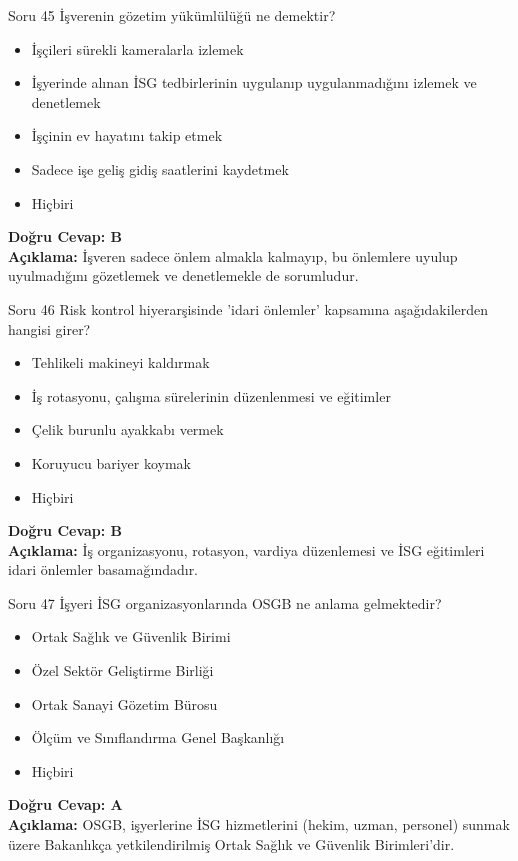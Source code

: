 \documentclass[12pt,a4paper]{article}
\begin{document}
\begin{testcard}{Soru 45}
    İşverenin gözetim yükümlülüğü ne demektir?
    \begin{itemize}
        \item[A)] İşçileri sürekli kameralarla izlemek
        \item[B)] İşyerinde alınan İSG tedbirlerinin uygulanıp uygulanmadığını izlemek ve denetlemek
        \item[C)] İşçinin ev hayatını takip etmek
        \item[D)] Sadece işe geliş gidiş saatlerini kaydetmek
        \item[E)] Hiçbiri
    \end{itemize}
    \tcblower
    \textbf{Doğru Cevap: B} \\
    \textbf{Açıklama:} İşveren sadece önlem almakla kalmayıp, bu önlemlere uyulup uyulmadığını gözetlemek ve denetlemekle de sorumludur.
\end{testcard}

\begin{testcard}{Soru 46}
    Risk kontrol hiyerarşisinde 'idari önlemler' kapsamına aşağıdakilerden hangisi girer?
    \begin{itemize}
        \item[A)] Tehlikeli makineyi kaldırmak
        \item[B)] İş rotasyonu, çalışma sürelerinin düzenlenmesi ve eğitimler
        \item[C)] Çelik burunlu ayakkabı vermek
        \item[D)] Koruyucu bariyer koymak
        \item[E)] Hiçbiri
    \end{itemize}
    \tcblower
    \textbf{Doğru Cevap: B} \\
    \textbf{Açıklama:} İş organizasyonu, rotasyon, vardiya düzenlemesi ve İSG eğitimleri idari önlemler basamağındadır.
\end{testcard}

\begin{testcard}{Soru 47}
    İşyeri İSG organizasyonlarında OSGB ne anlama gelmektedir?
    \begin{itemize}
        \item[A)] Ortak Sağlık ve Güvenlik Birimi
        \item[B)] Özel Sektör Geliştirme Birliği
        \item[C)] Ortak Sanayi Gözetim Bürosu
        \item[D)] Ölçüm ve Sınıflandırma Genel Başkanlığı
        \item[E)] Hiçbiri
    \end{itemize}
    \tcblower
    \textbf{Doğru Cevap: A} \\
    \textbf{Açıklama:} OSGB, işyerlerine İSG hizmetlerini (hekim, uzman, personel) sunmak üzere Bakanlıkça yetkilendirilmiş Ortak Sağlık ve Güvenlik Birimleri'dir.
\end{testcard}
\end{document}
